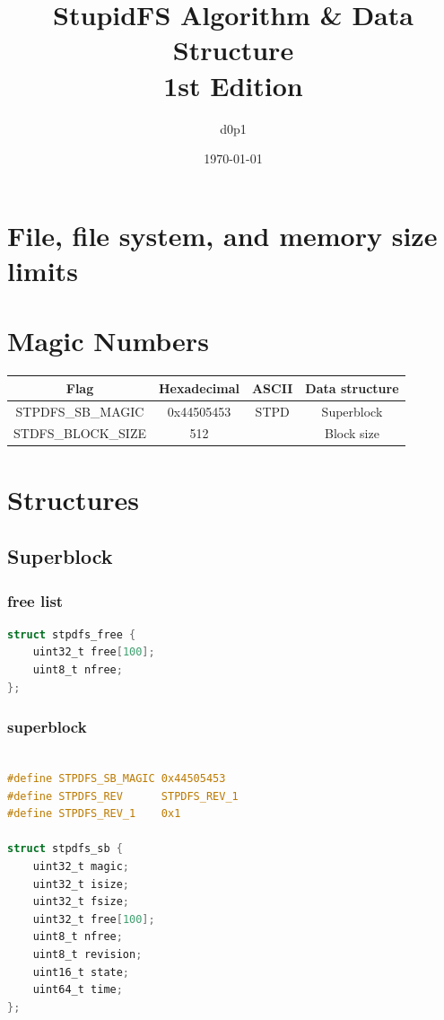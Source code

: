 \documentclass[a4paper, 12pt, openright, english]{scrbook}
\date{\today}
\title{%
	StupidFS Algorithm \& Data Structure \\
	\large 1st Edition}
\author{d0p1}
\begin{document}
	\frontmatter
	
	\maketitle
	\tableofcontents

	\mainmatter

	\chapter{File, file system, and memory size limits}

	\chapter{Magic Numbers}

	\begin{center}
		\begin{tabular}{ |c|c|c|c| } 
 			\hline
 			\textbf{Flag} & \textbf{Hexadecimal} & \textbf{ASCII} & \textbf{Data structure}  \\ 
			\hline
 			STPDFS\_SB\_MAGIC & 0x44505453 & STPD & Superblock \\
			STDFS\_BLOCK\_SIZE & 512 & &  Block size\\ 
 			\hline
		\end{tabular}
	\end{center}

	\chapter{Structures}

	\section{Superblock}

	\subsection{free list}

	\begin{lstlisting}[language=C]
struct stpdfs_free {
	uint32_t free[100];
	uint8_t nfree;
};
	\end{lstlisting}

	\subsection{superblock}

	\begin{lstlisting}[language=C]

#define STPDFS_SB_MAGIC 0x44505453
#define STPDFS_REV      STPDFS_REV_1
#define STPDFS_REV_1    0x1

struct stpdfs_sb {
	uint32_t magic;
	uint32_t isize;
	uint32_t fsize;
	uint32_t free[100];
	uint8_t nfree;
	uint8_t revision;
	uint16_t state;
	uint64_t time;
};
	\end{lstlisting}
\end{document}
